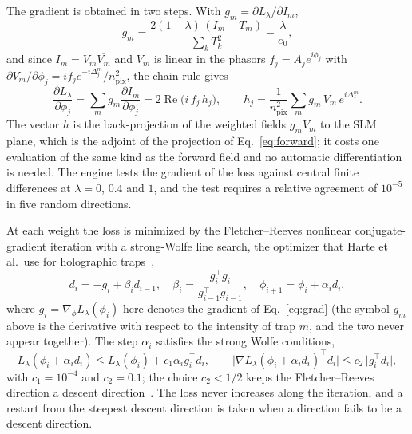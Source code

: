 The gradient is obtained in two steps. With $g_m=\partial L_\lambda/\partial I_m$,
\begin{equation}
g_m=\frac{2(1-\lambda)\,(I_m-T_m)}{\sum_kT_k^2}-\frac{\lambda}{e_0},\label{eq:gm}
\end{equation}
and since $I_m=V_m\overline{V_m}$ and $V_m$ is linear in the phasors $f_j=A_je^{i\phi_j}$ with $\partial V_m/\partial\phi_j=i f_je^{-i\Delta_j^m}/n_{\mathrm{pix}}^2$, the chain rule gives
\begin{equation}
\frac{\partial L_\lambda}{\partial\phi_j}=\sum_mg_m\frac{\partial I_m}{\partial\phi_j}=2\operatorname{Re}\Big(i\,f_j\,\overline{h_j}\Big),\qquad h_j=\frac1{n_{\mathrm{pix}}^2}\sum_mg_m\,V_m\,e^{i\Delta_j^m}.\label{eq:grad}
\end{equation}
The vector $h$ is the back-projection of the weighted fields $g_mV_m$ to the SLM plane, which is the adjoint of the projection of Eq.~\ref{eq:forward}; it costs one evaluation of the same kind as the forward field and no automatic differentiation is needed. The engine tests the gradient of the loss against
central finite differences at $\lambda=0$, $0.4$ and $1$, and the test requires a relative agreement of $10^{-5}$ in five random directions.

At each weight the loss is minimized by the Fletcher--Reeves nonlinear conjugate-gradient iteration with a strong-Wolfe line search, the optimizer that Harte et al.\ use for holographic traps~\cite{harte},
\begin{equation}
d_i=-g_i+\beta_i d_{i-1},\quad \beta_i=\frac{g_i^{\top}g_i}{g_{i-1}^{\top}g_{i-1}},\quad \phi_{i+1}=\phi_i+\alpha_i d_i,\label{eq:cg}
\end{equation}
where $g_i=\nabla_\phi L_\lambda(\phi_i)$ here denotes the gradient of Eq.~\ref{eq:grad} (the symbol $g_m$ above is the derivative with respect to the intensity of trap $m$, and the two never appear together). The step $\alpha_i$ satisfies the strong Wolfe conditions,
\begin{equation}
L_\lambda(\phi_i+\alpha_i d_i)\le L_\lambda(\phi_i)+c_1\alpha_i g_i^{\top}d_i,\qquad \big|\nabla L_\lambda(\phi_i+\alpha_i d_i)^{\top}d_i\big|\le c_2\,\big|g_i^{\top}d_i\big|,\label{eq:wolfe}
\end{equation}
with $c_1=10^{-4}$ and $c_2=0.1$; the choice $c_2<1/2$ keeps the Fletcher--Reeves direction a descent direction~\cite{nocedal}. The loss never increases along the iteration, and a restart from the steepest descent direction is taken when a direction fails to be a descent direction.

